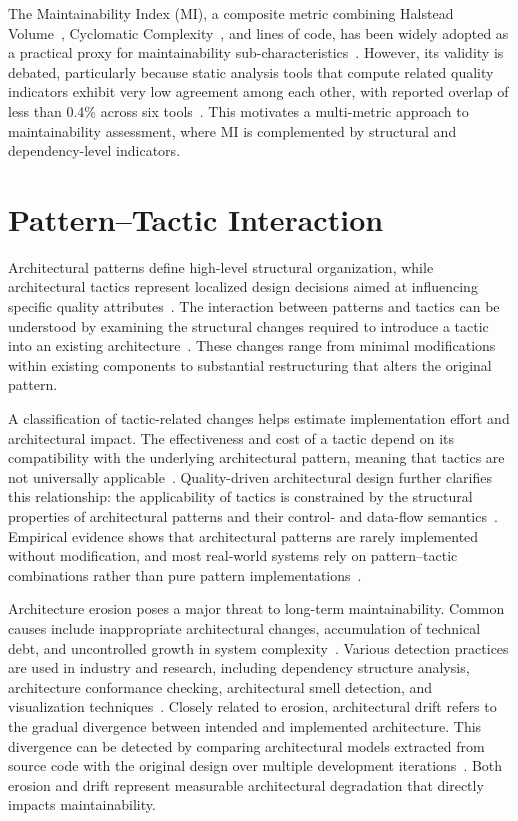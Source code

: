 The Maintainability Index (MI), a composite metric combining Halstead Volume~\cite{halstead1977elements}, Cyclomatic Complexity~\cite{mccabe1976complexity}, and lines of code, has been widely adopted as a practical proxy for maintainability sub-characteristics~\cite{oman1992maintainability}. However, its validity is debated, particularly because static analysis tools that compute related quality indicators exhibit very low agreement among each other, with reported overlap of less than 0.4\% across six tools~\cite{lenarduzzi2023critical}. This motivates a multi-metric approach to maintainability assessment, where MI is complemented by structural and dependency-level indicators.

\section{Pattern--Tactic Interaction}

Architectural patterns define high-level structural organization, while architectural tactics represent localized design decisions aimed at influencing specific quality attributes~\cite{bass2021software}. The interaction between patterns and tactics can be understood by examining the structural changes required to introduce a tactic into an existing architecture~\cite{harrison2010how}. These changes range from minimal modifications within existing components to substantial restructuring that alters the original pattern.

A classification of tactic-related changes helps estimate implementation effort and architectural impact. The effectiveness and cost of a tactic depend on its compatibility with the underlying architectural pattern, meaning that tactics are not universally applicable~\cite{harrison2010how}. Quality-driven architectural design further clarifies this relationship: the applicability of tactics is constrained by the structural properties of architectural patterns and their control- and data-flow semantics~\cite{kim2009qualitydriven}. Empirical evidence shows that architectural patterns are rarely implemented without modification, and most real-world systems rely on pattern--tactic combinations rather than pure pattern implementations~\cite{kassab2018software}.

Architecture erosion poses a major threat to long-term maintainability. Common causes include inappropriate architectural changes, accumulation of technical debt, and uncontrolled growth in system complexity~\cite{li2021understanding}. Various detection practices are used in industry and research, including dependency structure analysis, architecture conformance checking, architectural smell detection, and visualization techniques~\cite{li2021understanding}. Closely related to erosion, architectural drift refers to the gradual divergence between intended and implemented architecture. This divergence can be detected by comparing architectural models extracted from source code with the original design over multiple development iterations~\cite{rosik2011assessing}. Both erosion and drift represent measurable architectural degradation that directly impacts maintainability.

